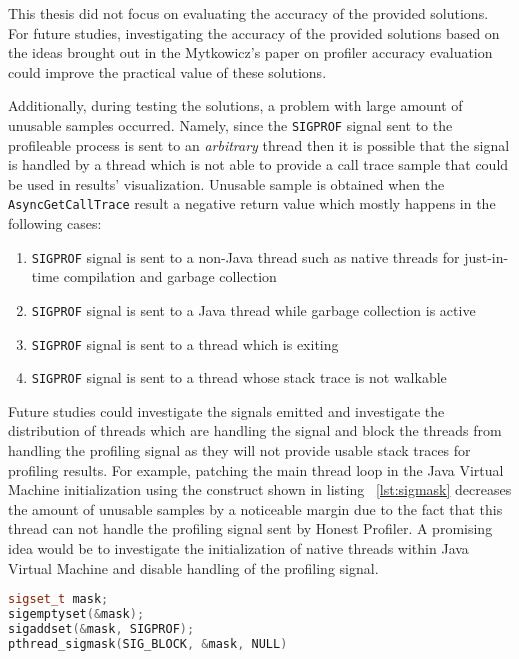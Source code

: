 \documentclass[..thesis.tex]{subfiles}
\begin{document}
This thesis did not focus on evaluating the accuracy of the provided solutions. For future studies, investigating the accuracy of the provided solutions based on the ideas brought out in the Mytkowicz's paper on profiler accuracy evaluation \cite{mytkowicz_evaluating_2010} could improve the practical value of these solutions.

Additionally, during testing the solutions, a problem with large amount of unusable samples occurred. Namely, since the \texttt{SIGPROF} signal sent to the profileable process is sent to an \textit{arbitrary} thread then it is possible that the signal is handled by a thread which is not able to provide a call trace sample that could be used in results' visualization. Unusable sample is obtained when the \texttt{Async\-Get\-Call\-Trace} result a negative return value which mostly happens in the following cases:
\begin{enumerate}
	\item \texttt{SIGPROF} signal is sent to a non-Java thread such as native threads for just-in-time compilation and garbage collection
	\item \texttt{SIGPROF} signal is sent to a Java thread while garbage collection is active
	\item \texttt{SIGPROF} signal is sent to a thread which is exiting
	\item \texttt{SIGPROF} signal is sent to a thread whose stack trace is not walkable
\end{enumerate}

Future studies could investigate the signals emitted and investigate the distribution of threads which are handling the signal and block the threads from handling the profiling signal as they will not provide usable stack traces for profiling results.
For example, patching the main thread loop in the Java Virtual Machine initialization using the construct shown in listing ~\ref{lst:sigmask} decreases the amount of unusable samples by a noticeable margin due to the fact that this thread can not handle the profiling signal sent by Honest Profiler. A promising idea would be to investigate the initialization of native threads within Java Virtual Machine and disable handling of the profiling signal.

\begin{lstlisting}[language=C++,style=def,label={lst:sigmask}, caption={Blocking the \texttt{SIGPROF} signal for a thread}]
sigset_t mask;
sigemptyset(&mask);
sigaddset(&mask, SIGPROF);
pthread_sigmask(SIG_BLOCK, &mask, NULL)
\end{lstlisting}
\end{document}
